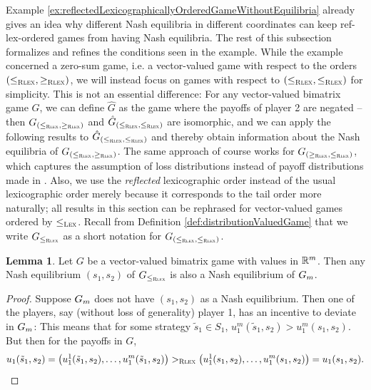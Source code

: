 \documentclass[a4paper,DIV=11,abstracton,twoside=semi]{scrreprt}
\theoremstyle{definition}
\newtheorem{lemma}[thm]{Lemma} %
\begin{document}
    Example \ref{ex:reflectedLexicographicallyOrderedGameWithoutEquilibria} already gives an idea why different Nash equilibria in different coordinates can keep ref-lex-ordered games from having Nash equilibria. The rest of this subsection formalizes and refines the conditions seen in the example.
    While the example concerned a zero-sum game, i.e. a vector-valued game with respect to the orders ${(\leq_{\textsc{Rlex}},\geq_{\textsc{Rlex}})}$, we will instead focus on games with respect to ${(\leq_{\textsc{Rlex}},\leq_{\textsc{Rlex}})}$ for simplicity. This is not an essential difference: 
    For any vector-valued bimatrix game $G$, we can define $\hat{G}$ as the game where the payoffs of player 2 are negated -- then $G_{{(\leq_{\textsc{Rlex}},\geq_{\textsc{Rlex}})}}$ and $\hat{G}_{{(\leq_{\textsc{Rlex}},\leq_{\textsc{Rlex}})}}$ are isomorphic, and we can apply the following results to $\hat{G}_{{(\leq_{\textsc{Rlex}},\leq_{\textsc{Rlex}})}}$ and thereby obtain information about the Nash equilibria of $G_{{(\leq_{\textsc{Rlex}},\geq_{\textsc{Rlex}})}}$.
    The same approach of course works for $G_{{(\geq_{\textsc{Rlex}},\leq_{\textsc{Rlex}})}}$, which captures the assumption of loss distributions instead of payoff distributions made in \cite{bib:rassGameRiskManagI}. 
    Also, we use the \emph{reflected} lexicographic order instead of the usual lexicographic order merely because it corresponds to the tail order more naturally; all results in this section can be rephrased for vector-valued games ordered by $\leq_{\textsc{Lex}}$.
    Recall from Definition \ref{def:distributionValuedGame} that we write $G_{\leq_{\textsc{Rlex}}}$ as a short notation for $G_{(\leq_{\textsc{Rlex}}, \leq_{\textsc{Rlex}})}$.
    
    \begin{lemma}
        \label{lem:GmHasAllNashEquilibriaOfG}
        Let $G$ be a vector-valued bimatrix game with values in $\mathbb{R}^m$.
        Then any Nash equilibrium $(s_1, s_2)$ of $G_{\leq_{\textsc{Rlex}}}$ is also a Nash equilibrium of $G_{m}$.
    \end{lemma}
    \begin{proof}
        Suppose $G_{m}$ does not have $(s_1, s_2)$ as a Nash equilibrium.
        Then one of the players, say (without loss of generality) player 1, has an incentive to deviate in $G_{m}$:
        This means that for some strategy $\tilde{s}_1 \in S_1$, $u_1^{m}(\tilde{s}_1, s_2) > u_1^{m}(s_1, s_2)$.
        But then for the payoffs in $G$, 
        \begin{gather*}
            u_1(\tilde{s}_1, s_2) = \bigl(u_1^{1}(\tilde{s}_1, s_2), \dots, u_1^{m}(\tilde{s}_1, s_2)\bigr)
            >_{\textsc{Rlex}} \bigl(u_1^{1}(s_1, s_2), \dots, u_1^{m}(s_1, s_2)\bigr) = u_1(s_1, s_2).
        \end{gather*}
    \end{proof}
\end{document}
